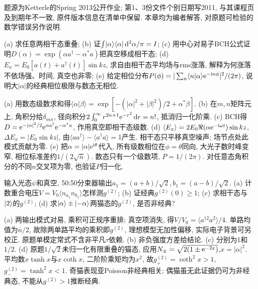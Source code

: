 题源为Ketterle的Spring 2013公开作业; 第1、3份文件个别日期写2011, 与其课程页及到期年不一致, 原件版本信息在清单中保留. 本章均为编者解答, 对原题可检验的数学错误另作说明.
\begin{exercise}(a) 求任意两相干态重叠; (b) 证$\int\lvert \alpha\rangle\langle \alpha\rvert\,\mathrm d^2\alpha/\pi=I$; (c) 用中心对易子BCH公式证明$D(\alpha)=\exp(\alpha a^\dagger-\alpha^*a)$把真空移成相干态; (d) $E_x=E_0[a(t)+a^\dagger(t)]\sin kz$, 求自由相干态平均场与rms涨落, 解释为何涨落不依场强、时间, 真空也非零; (e) 给定相位分布$P(\phi)=|\sum_n\langle n|\alpha\rangle\mathrm e^{-\mathrm i n\phi}|^2/(2\pi)$, 说明大$|\alpha|$的经典相位极限与数态无相位.\end{exercise}
\begin{solution}(a) 用数态级数求和得$\langle\alpha|\beta\rangle=\exp[-(|\alpha|^2+|\beta|^2)/2+\alpha^*\beta]$. (b) 在$m,n$矩阵元上, 角积分给$\delta_{mn}$, 径向积分$2\int_0^\infty r^{2n+1}\mathrm e^{-r^2}\,\mathrm d r=n!$, 抵消归一化阶乘. (c) BCH得$D=\mathrm e^{-|\alpha|^2/2}\mathrm e^{\alpha a^\dagger}\mathrm e^{-\alpha^*a}$, 作用真空即相干态级数. (d) $\langle E_x\rangle=2E_0\Re(\alpha\mathrm e^{-\mathrm i\omega t})\sin kz$, $\Delta E_x=|E_0\sin kz|$, 由$\langle aa^\dagger\rangle-\langle a^\dagger a\rangle=1$产生. 相干态只平移真空噪声; 场节点处此模式贡献为零. (e) 把$\alpha=|\alpha|\mathrm e^{\mathrm i\theta}$代入, 所有级数相位在$\phi=\theta$同向, 大光子数时峰变窄, 相位标准差约$1/(2\sqrt{\bar n})$. 数态只有一个级数项, $P=1/(2\pi)$. 对任意态角积分的不同$n$交叉项为零, 也验证$P$归一化.
\end{solution}
\begin{exercise}输入光态$\psi$和真空, 50:50分束器输出$a_1=(a+b)/\sqrt2,b_1=(a-b)/\sqrt2$. (a) 计数重合电压$V=V_0\langle n_{a_1}n_{b_1}\rangle$怎样测$g^{(2)}$; (b) 证经典$g^{(2)}(0)\ge1$; (c) 求相干态与$\lvert 2\rangle$的$g^{(2)}$; (d) 求$\lvert \alpha\rangle\pm\lvert -\alpha\rangle$两猫态的$g^{(2)}$, 是否非经典?\end{exercise}
\begin{solution}(a) 两输出模式对易, 乘积可正规序重排; 真空项消失, 得$V/V_0=\langle a^{\dagger2}a^2\rangle/4$. 单路均值为$\bar n/2$, 故除两单路平均的乘积即$g^{(2)}$, 理想模型无加性偏移, 实际电子背景可另校正. 原题单模定常式不含非平凡$\tau$依赖. (b) 非负强度方差给结论. (c) 分别为1和$1/2$. (d) 原题$1/\sqrt2$未归一化有限重叠的猫态, 应用$N_\pm=\sqrt{2(1\pm\mathrm e^{-2x})}$,$x=|\alpha|^2$. 平均数$x\tanh x$与$x\coth x$, 二阶阶乘矩均为$x^2$, 故$g_+^{(2)}=\coth^2x>1$,$g_-^{(2)}=\tanh^2x<1$. 奇猫表现亚Poisson非经典相关; 偶猫虽无此证据仍可为非经典态, 不能从$g^{(2)}>1$推断经典.
\end{solution}
